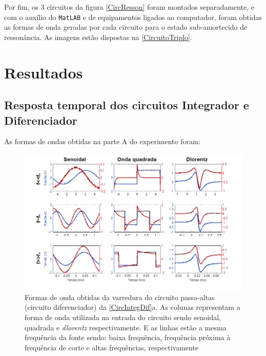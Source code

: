 \documentclass[11pt,a4paper]{article}
\begin{document}
    Por fim, os 3 circuitos da figura \cref{CircResson} foram montados separadamente, e com o auxílio do \texttt{MatLAB} e de equipamentos ligados ao computador, foram obtidas as formas de onda geradas por cada circuito para o estado sub-amortecido de ressonância. As imagens estão dispostas na \cref{CircuitoTriplo}.
    
    

\newpage
\section{Resultados}
    
    \subsection{Resposta temporal dos circuitos Integrador e Diferenciador}
    
    As formas de ondas obtidas na parte A do experimento foram:
        \begin{figure}[!htb]
        \centering
        \includegraphics[scale=0.8]{PassaAltaVarredura.png}
        \caption{Formas de onda obtidas da varredura do circuito passa-altas (circuito diferenciador) da \cref{CircIntegDif}a. As colunas representam a forma de onda utilizada na entrada do circuito sendo senoidal, quadrada e \textit{dlorentz} respectivamente. E as linhas estão a mesma frequência da fonte sendo: baixa frequência, frequência próxima à frequência de corte e altas frequências, respectivamente}
        \label{PassaAltaVarredura}
        \end{figure}
    
\end{document}
